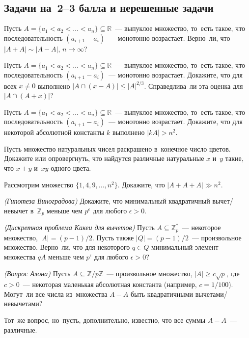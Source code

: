 \subsection*{Задачи на~2--3 балла и нерешенные задачи}
\resetproblem

\begin{problems}

\item
Пусть $A = \{ a_1 < a_2 < \ldots < a_n \} \subseteq \mathbb{R}$~---
выпуклое множество, то~есть такое, что последовательность
$(a_{i+1} - a_i)$~--- монотонно возрастает.
Верно~ли, что $|A + A| \sim |A - A|$, $n \to \infty$?

\item
Пусть $A = \{ a_1 < a_2 < \ldots < a_n \} \subseteq \mathbb{R}$~---
выпуклое множество, то~есть такое, что последовательность
$(a_{i+1} - a_i)$~--- монотонно возрастает.
Докажите, что для всех $x \neq 0$ выполнено
\(
    \bigl| A \cap (x - A) \bigr| \leq |A|^{2/3}
\).
Справедлива~ли эта оценка для $\bigl| A \cap (A + x) \bigr|$?

\item
Пусть $A = \{ a_1 < a_2 < \ldots < a_n \} \subseteq \mathbb{R}$~--- выпуклое
множество, то~есть такое, что последовательность $(a_{i+1} - a_i)$~---
монотонно возрастает.
Докажите, что для некоторой абсолютной константы $k$ выполнено $|k A| > n^2$.

\itemx{*}
Пусть множество натуральных чисел раскрашено в~конечное число цветов.
Докажите или опровергнуть, что найдутся различные натуральные $x$ и~$y$ такие,
что $x + y$ и~$x y$ одного цвета.

\item
Рассмотрим множество $\{ 1, 4, 9, \ldots, n^2 \}$.
Докажите, что $|A + A + A| \gg n^2$.

\itemx{*}\emph{(Гипотеза Виноградова)}\enspace
Докажите, что минимальный квадратичный вычет/\linebreak[0]невычет
в~$\mathbb{Z}_p$ меньше чем $p^{\epsilon}$ для любого $\epsilon > 0$.

\itemx{*}\emph{(Дискретная проблема Какеи для вычетов)}\enspace
Пусть $A \subseteq \mathbb{Z}^*_p$~--- некоторое множество,
$|A| = (p - 1) / 2$.
Пусть также $|Q| = (p - 1) / 2$~--- произвольное множество.
Верно~ли, что для некоторого $q \in Q$ минимальный элемент множества $q A$
меньше чем $p^{\epsilon}$ для любого $\epsilon > 0$?

\itemx{*}\emph{(Вопрос Алона)}\enspace
Пусть $A \subseteq \mathbb{Z} / p \mathbb{Z}$~--- произвольное множество,
$|A| \geq c \sqrt{p}$, где $c > 0$~--- некоторая маленькая абсолютная константа
(например, $c = 1 / 100$).
Могут~ли все числа из~множества $A - A$ быть квадратичными вычетами/невычетами?
\par
Тот~же вопрос, но~пусть, дополнительно, известно, что все суммы $A - A$~---
различные.


\end{problems}
